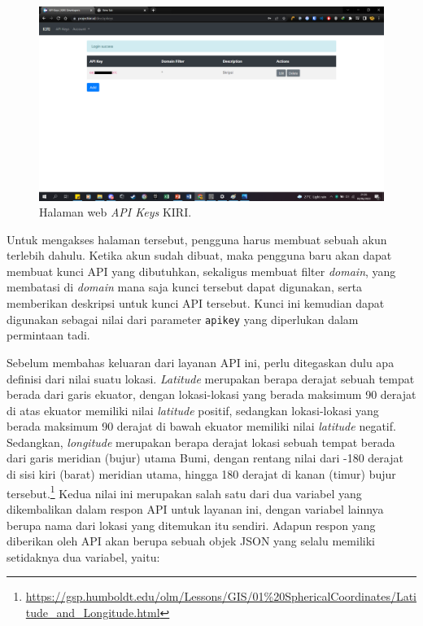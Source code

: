 \documentclass[a4paper,twoside]{article}
\begin{document}
\begin{enumerate}
\begin{figure}[t]
    \centering
    \includegraphics[width=0.75\linewidth]{projectkiri-apikey}
    \caption[Halaman web \textit{API Keys} KIRI.]{Halaman web \textit{API Keys} KIRI.}
    \label{fig:kiri-apikeypage}
\end{figure}

Untuk mengakses halaman tersebut, pengguna harus membuat sebuah akun terlebih dahulu. Ketika akun sudah dibuat, maka pengguna baru akan dapat membuat kunci API yang dibutuhkan, sekaligus membuat filter \textit{domain}, yang membatasi di \textit{domain} mana saja kunci tersebut dapat digunakan, serta memberikan deskripsi untuk kunci API tersebut. Kunci ini kemudian dapat digunakan sebagai nilai dari parameter \verb|apikey| yang diperlukan dalam permintaan tadi.

Sebelum membahas keluaran dari layanan API ini, perlu ditegaskan dulu apa definisi dari nilai \latlon suatu lokasi. \textit{Latitude} merupakan berapa derajat sebuah tempat berada dari garis ekuator, dengan lokasi-lokasi yang berada maksimum 90 derajat di atas ekuator memiliki nilai \textit{latitude} positif, sedangkan lokasi-lokasi yang berada maksimum 90 derajat di bawah ekuator memiliki nilai \textit{latitude} negatif. Sedangkan, \textit{longitude} merupakan berapa derajat lokasi sebuah tempat berada dari garis meridian (bujur) utama Bumi, dengan rentang nilai dari -180 derajat di sisi kiri (barat) meridian utama, hingga 180 derajat di kanan (timur) bujur tersebut.\footnote{\href{https://gsp.humboldt.edu/olm/Lessons/GIS/01\%20SphericalCoordinates/Latitude\_and\_Longitude.html}{https://gsp.humboldt.edu/olm/Lessons/GIS/01\%20SphericalCoordinates/Latitude\_and\_Longitude.html}} Kedua nilai ini merupakan salah satu dari dua variabel yang dikembalikan dalam respon API untuk layanan ini, dengan variabel lainnya berupa nama dari lokasi yang ditemukan itu sendiri. Adapun respon yang diberikan oleh API akan berupa sebuah objek JSON yang selalu memiliki setidaknya dua variabel, yaitu:


\end{enumerate}
\end{document}
